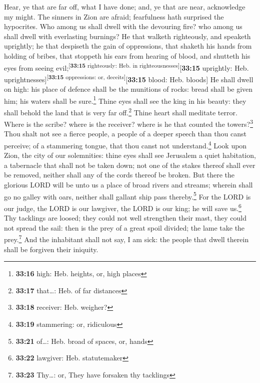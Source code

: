  Hear, ye that are far off, what I have done; and, ye
that are near, acknowledge my might.  The sinners in Zion
are afraid; fearfulness hath surprised the hypocrites. Who among us
shall dwell with the devouring fire? who among us shall dwell with
everlasting burnings?  He that walketh righteously, and
speaketh uprightly; he that despiseth the gain of oppressions, that
shaketh his hands from holding of bribes, that stoppeth his ears from
hearing of blood, and shutteth his eyes from seeing
evil;\textsuperscript{{[}\textbf{33:15} righteously: Heb. in
righteousnesses{]}}{[}\textbf{33:15} uprightly: Heb.
uprightnesses{]}\textsuperscript{{[}\textbf{33:15} oppressions: or,
deceits{]}}{[}\textbf{33:15} blood: Heb. bloods{]}  He
shall dwell on high: his place of defence shall be the munitions of
rocks: bread shall be given him; his waters shall be sure.\footnote{\textbf{33:16}
  high: Heb. heights, or, high places}  Thine eyes shall
see the king in his beauty: they shall behold the land that is very far
off.\footnote{\textbf{33:17} that\ldots: Heb. of far distances}
 Thine heart shall meditate terror. Where is the scribe?
where is the receiver? where is he that counted the towers?\footnote{\textbf{33:18}
  receiver: Heb. weigher?}  Thou shalt not see a fierce
people, a people of a deeper speech than thou canst perceive; of a
stammering tongue, that thou canst not understand.\footnote{\textbf{33:19}
  stammering: or, ridiculous}  Look upon Zion, the city
of our solemnities: thine eyes shall see Jerusalem a quiet habitation, a
tabernacle that shall not be taken down; not one of the stakes thereof
shall ever be removed, neither shall any of the cords thereof be broken.
 But there the glorious LORD will be unto us a place of
broad rivers and streams; wherein shall go no galley with oars, neither
shall gallant ship pass thereby.\footnote{\textbf{33:21} of\ldots: Heb.
  broad of spaces, or, hands}  For the LORD is our judge,
the LORD is our lawgiver, the LORD is our king; he will save
us.\footnote{\textbf{33:22} lawgiver: Heb. statutemaker} 
Thy tacklings are loosed; they could not well strengthen their mast,
they could not spread the sail: then is the prey of a great spoil
divided; the lame take the prey.\footnote{\textbf{33:23} Thy\ldots: or,
  They have forsaken thy tacklings}  And the inhabitant
shall not say, I am sick: the people that dwell therein shall be
forgiven their iniquity.

